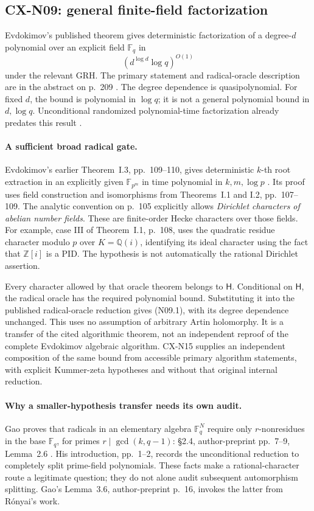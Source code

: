 \documentclass[11pt,a4paper]{article}
\begin{document}
\subsection{CX-N09: general finite-field factorization}
\label{cx-n09}

Evdokimov's published theorem gives deterministic factorization of a
degree-\(d\) polynomial over an explicit field \(\mathbb F_q\) in
\[
                            (d^{\log d}\log q)^{O(1)}            \tag{N09.1}
\]
under the relevant GRH. The primary statement and radical-oracle
description are in the abstract on p.~209 \cite{CXNEvdokimov94}.
The degree dependence is quasipolynomial. For fixed \(d\), the bound
is polynomial in \(\log q\); it is not a general polynomial bound
in \(d,\log q\). Unconditional randomized polynomial-time factorization
already predates this result \cite[introduction, author pp.~1--2]{CXNGao01}.

\paragraph{A sufficient broad radical gate.}
Evdokimov's earlier Theorem~I.3, pp.~109--110, gives deterministic
\(k\)-th root extraction in an explicitly given \(\mathbb F_{p^m}\)
in time polynomial in \(k,m,\log p\) \cite{CXNEvdokimov89}.
Its proof uses field construction and isomorphisms from
Theorems~I.1 and I.2, pp.~107--109. The analytic convention on p.~105
explicitly allows \emph{Dirichlet characters of abelian number fields}.
These are finite-order Hecke characters over those fields.
For example, case III of Theorem~I.1, p.~108, uses the quadratic
residue character modulo \(p\) over \(K=\mathbb Q(i)\), identifying
its ideal character using the fact that \(\mathbb Z[i]\) is a PID.
The hypothesis is not automatically the rational Dirichlet assertion.

Every character allowed by that oracle theorem belongs to
\(\mathsf H\). Conditional on \(\mathsf H\), the radical oracle has
the required polynomial bound. Substituting it into the published
radical-oracle reduction gives (N09.1), with its degree dependence
unchanged. This uses no assumption of arbitrary Artin holomorphy.
It is a transfer of the cited algorithmic theorem, not an independent
reproof of the complete Evdokimov algebraic algorithm.
CX-N15 supplies an independent composition of the same bound from
accessible primary algorithm statements, with explicit Kummer-zeta
hypotheses and without that original internal reduction.

\paragraph{Why a smaller-hypothesis transfer needs its own audit.}
Gao proves that radicals in an elementary algebra
\(\mathbb F_q^N\) require only \(r\)-nonresidues in the base
\(\mathbb F_q\), for primes \(r\mid\gcd(k,q-1)\):
\S2.4, author-preprint pp.~7--9, Lemma~2.6 \cite{CXNGao01}.
His introduction, pp.~1--2, records the unconditional reduction to
completely split prime-field polynomials.
These facts make a rational-character route a legitimate question;
they do not alone audit subsequent automorphism splitting.
Gao's Lemma~3.6, author-preprint p.~16, invokes the latter from
R\'onyai's work.
\end{document}
